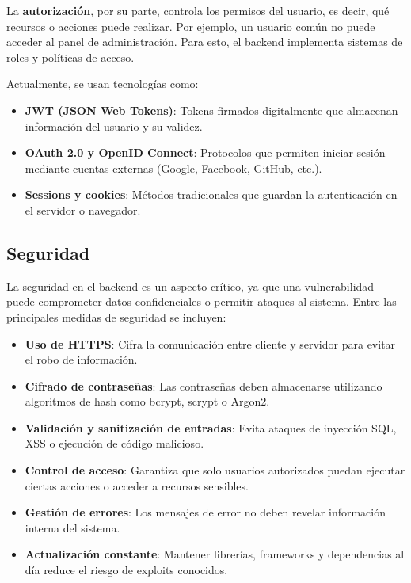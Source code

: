\documentclass[11pt]{scrartcl}
\begin{document}
La \textbf{autorización}, por su parte, controla los permisos del usuario, es decir, qué recursos o acciones puede realizar. Por ejemplo, un usuario común no puede acceder al panel de administración.  
Para esto, el backend implementa sistemas de roles y políticas de acceso.

Actualmente, se usan tecnologías como:
\begin{itemize}
    \item \textbf{JWT (JSON Web Tokens)}: Tokens firmados digitalmente que almacenan información del usuario y su validez.
    \item \textbf{OAuth 2.0 y OpenID Connect}: Protocolos que permiten iniciar sesión mediante cuentas externas (Google, Facebook, GitHub, etc.).
    \item \textbf{Sessions y cookies}: Métodos tradicionales que guardan la autenticación en el servidor o navegador.
\end{itemize}

\subsection{Seguridad}
La seguridad en el backend es un aspecto crítico, ya que una vulnerabilidad puede comprometer datos confidenciales o permitir ataques al sistema.  
Entre las principales medidas de seguridad se incluyen:

\begin{itemize}
    \item \textbf{Uso de HTTPS}: Cifra la comunicación entre cliente y servidor para evitar el robo de información.
    \item \textbf{Cifrado de contraseñas}: Las contraseñas deben almacenarse utilizando algoritmos de hash como bcrypt, scrypt o Argon2.
    \item \textbf{Validación y sanitización de entradas}: Evita ataques de inyección SQL, XSS o ejecución de código malicioso.
    \item \textbf{Control de acceso}: Garantiza que solo usuarios autorizados puedan ejecutar ciertas acciones o acceder a recursos sensibles.
    \item \textbf{Gestión de errores}: Los mensajes de error no deben revelar información interna del sistema.
    \item \textbf{Actualización constante}: Mantener librerías, frameworks y dependencias al día reduce el riesgo de exploits conocidos.
\end{itemize}
\end{document}
